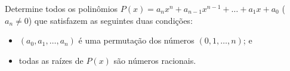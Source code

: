 Determine todos os polinômios \(P(x) = a_n x^n + a_{n-1} x^{n-1} + \ldots + a_1 x + a_0\) (\(a_n \ne 0\)) que satisfazem as seguintes duas condições:
\begin{itemize}
    \item[(i)] \((a_0,a_1,\ldots,a_n)\) é uma permutação dos números \((0,1,\ldots,n)\); e
    \item[(ii)] todas as raízes de \(P(x)\) são números racionais.
\end{itemize}
